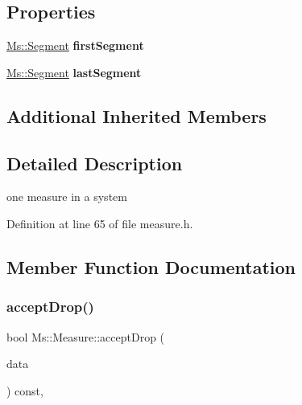 \subsection*{Properties}
\begin{DoxyCompactItemize}
\item 
\mbox{\label{class_ms_1_1_measure_a26ca5751b6e633f4bda443a1633a3c95}} 
\hyperlink{class_ms_1_1_segment}{Ms\+::\+Segment} {\bfseries first\+Segment}
\item 
\mbox{\label{class_ms_1_1_measure_a23ec4e9b764da6b55d1b8e66aff25b15}} 
\hyperlink{class_ms_1_1_segment}{Ms\+::\+Segment} {\bfseries last\+Segment}
\end{DoxyCompactItemize}
\subsection*{Additional Inherited Members}


\subsection{Detailed Description}
one measure in a system 

Definition at line 65 of file measure.\+h.



\subsection{Member Function Documentation}
\mbox{\label{class_ms_1_1_measure_a5964d737ffa873b7772cbf81e0092987}} 
\subsubsection{\texorpdfstring{accept\+Drop()}{acceptDrop()}}
{\footnotesize\ttfamily bool Ms\+::\+Measure\+::accept\+Drop (\begin{DoxyParamCaption}\item[{\hyperlink{class_ms_1_1_edit_data}{Edit\+Data} \&}]{data }\end{DoxyParamCaption}) const\hspace{0.3cm}{\ttfamily [override]}, {\ttfamily [virtual]}}

